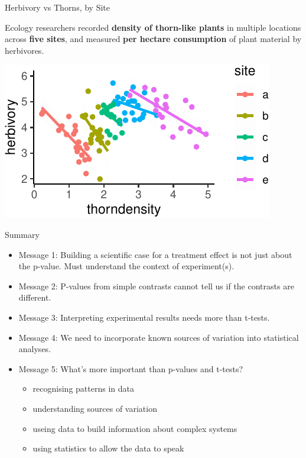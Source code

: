 \documentclass[
  12pt,
  ignorenonframetext,
  aspectratio=169,
]{beamer}
\providecommand{\tightlist}{%
  \setlength{\itemsep}{0pt}\setlength{\parskip}{0pt}}
\begin{document}
\begin{frame}{Herbivory vs Thorns, by Site}
\protect\hypertarget{herbivory-vs-thorns-by-site}{}

Ecology researchers recorded \textbf{density of thorn-like plants} in
multiple locations across \textbf{five sites}, and measured \textbf{per
hectare consumption} of plant material by herbivores.

\begin{center}\includegraphics{Lecture-1_files/figure-beamer/unnamed-chunk-11-1} \end{center}

\end{frame}

\begin{frame}{Summary}
\protect\hypertarget{summary}{}

\begin{itemize}
\item
  Message 1: Building a scientific case for a treatment effect is not
  just about the p-value. Must understand the context of experiment(s).
\item
  Message 2: P-values from simple contrasts cannot tell us if the
  contrasts are different.
\item
  Message 3: Interpreting experimental results needs more than t-tests.
\item
  Message 4: We need to incorporate known sources of variation into
  statistical analyses.
\item
  Message 5: What's more important than p-values and t-tests?

  \begin{itemize}
  \tightlist
  \item
    recognising patterns in data
  \item
    understanding sources of variation
  \item
    useing data to build information about complex systems
  \item
    using statistics to allow the data to speak
  \end{itemize}
\end{itemize}

\end{frame}
\end{document}
